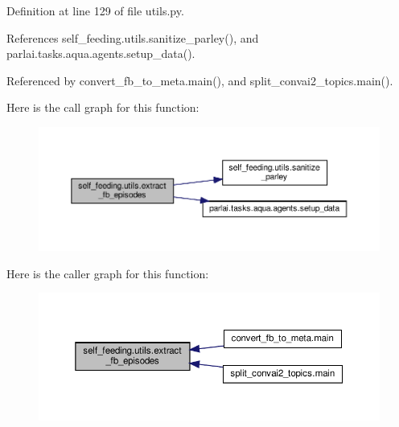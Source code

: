 Definition at line 129 of file utils.\+py.



References self\+\_\+feeding.\+utils.\+sanitize\+\_\+parley(), and parlai.\+tasks.\+aqua.\+agents.\+setup\+\_\+data().



Referenced by convert\+\_\+fb\+\_\+to\+\_\+meta.\+main(), and split\+\_\+convai2\+\_\+topics.\+main().

Here is the call graph for this function\+:
\nopagebreak
\begin{figure}[H]
\begin{center}
\leavevmode
\includegraphics[width=350pt]{namespaceself__feeding_1_1utils_a578aab95575fe72eee6768341a257a05_cgraph}
\end{center}
\end{figure}
Here is the caller graph for this function\+:
\nopagebreak
\begin{figure}[H]
\begin{center}
\leavevmode
\includegraphics[width=350pt]{namespaceself__feeding_1_1utils_a578aab95575fe72eee6768341a257a05_icgraph}
\end{center}
\end{figure}
\mbox{\label{namespaceself__feeding_1_1utils_ab5320af5eed839794f63c16ab25ec8a8}} 
